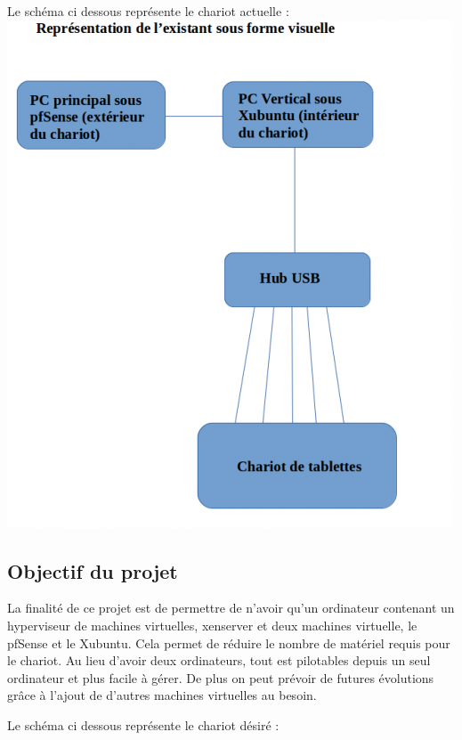 \documentclass[a4paper,12pt]{article}
\begin{document}
Le schéma ci dessous représente le chariot actuelle :\\

\includegraphics{representation_existant}
\clearpage
\subsection{Objectif du projet}

La finalité de ce projet est de permettre de n’avoir qu’un ordinateur contenant un hyperviseur de machines virtuelles, xenserver et deux machines virtuelle, le pfSense et le Xubuntu.
Cela permet de réduire le nombre de matériel requis pour le chariot. Au lieu d’avoir deux ordinateurs, tout est pilotables depuis un seul ordinateur et plus facile à gérer. De plus on peut prévoir de futures évolutions grâce à l’ajout de d’autres machines virtuelles au besoin.

Le schéma ci dessous représente le chariot désiré :\\
\end{document}
